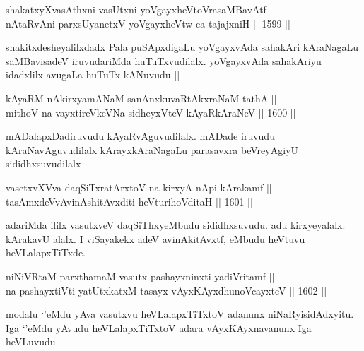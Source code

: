 \begin{shl}
shakatxyXvasAthxni vasUtxni yoVgayxheVtoVrasaMBavAtf || \\
nA\s \s taRvAni parxsUyanetxV yoVgayxheVtw ca tajajxniH ||  1599  || 
\end{shl}

\begin{artha}
shakitxdesheyalilxdadx Pala puSApxdigaLu yoVgayxvAda sahakAri kAraNagaLu saMBavisadeV iruvudariMda huTuTxvudilalx. yoVgayxvAda sahakAriyu idadxlilx avugaLa huTuTx kANuvudu ||
\end{artha}


\begin{shl}
kAyaRM nAkirxyamANaM sanAnxkuvaRtAkxraNaM tathA || \\
mithoV na vayxtireVkeVNa sidheyxVteV kAyaRkAraNeV ||  1600 ||  
\end{shl}

\begin{artha}
mADalapxDadiruvudu kAyaRvAguvudilalx. mADade iruvudu  kAraNavAguvudilalx kArayxkAraNagaLu parasavxra beVreyAgiyU sididhxsuvudilalx
\end{artha}


\begin{shl}
vasetxvXVva daqSiTxratArxtoV na kirxyA nApi kArakamf || \\
tasAmxdeVvAvinAshitAvxditi heVturihoVditaH ||  1601 ||  
\end{shl}

\begin{artha}
adariMda ililx vasutxveV daqSiThxyeMbudu sididhxsuvudu. adu kirxyeyalalx. kArakavU alalx. I viSayakekx adeV avinAkitAvxtf, eMbudu heVtuvu heVLalapxTiTxde.
\end{artha}

\begin{shl}
niNiVRtaM parxthamaM vasutx pashayxninxti yadiVritamf || \\
na pashayxtiVti yatUtxkatxM tasayx vAyxKAyx\s dhunoVcayxteV ||  1602 ||  
\end{shl}

\begin{artha}
modalu `\stext'eMdu yAva vasutxvu heVLalapxTiTxtoV adanunx niNaRyisidAdxyitu. Iga `\stext'eMdu yAvudu heVLalapxTiTxtoV adara vAyxKAyxnavanunx Iga heVLuvudu-
\end{artha}

